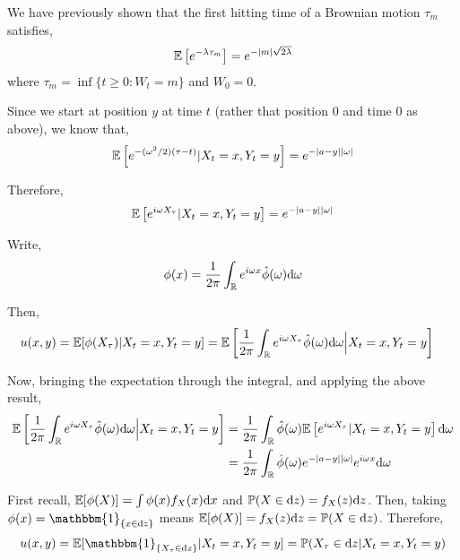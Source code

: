 \documentclass[10pt]{article}
\begin{document}
\begin{solution}[Solution]
\begin{enumerate}
        We have previously shown that the first hitting time of a Brownian motion \( \tau_m \) satisfies,
        \begin{align*}
            \mathbb{E}\left[ e^{-\lambda \tau_m}\right] = e^{-|m|\sqrt{2 \lambda}}
        \end{align*}
        where \( \tau_m = \inf\{t\geq 0 : W_t = m\} \) and \( W_0 = 0 \). 

        Since we start at position \( y \) at time \( t \) (rather that position \( 0 \) and time \( 0 \) as above), we know that,
        \begin{align*}
            \mathbb{E}\left[ e^{-(\omega^2/2)(\tau-t)} | X_t=x, Y_t = y\right] = e^{-|a-y||\omega|} 
        \end{align*}
        
        Therefore,
        \begin{align*}
            \mathbb{E} \left[ e^{i\omega X_\tau} | X_t = x, Y_t = y \right] = e^{-|a-y||\omega|}
        \end{align*}
        
        Write,
        \begin{align*}
            \phi(x) = \dfrac{1}{2\pi} \int_{\mathbb{R}} e^{i\omega x}\hat{\phi}(\omega) \mathrm{d} \omega
        \end{align*}
        
        Then,
        \begin{align*}
            u(x,y) = \mathbb{E}[ \phi(X_\tau) | X_t = x, Y_t = y ] 
            &= \mathbb{E} \left[ \dfrac{1}{2\pi}\int_{\mathbb{R}} e^{i\omega X_\tau} \hat{\phi}(\omega) \mathrm{d} \omega \Big| X_t = x, Y_t = y\right] 
        \end{align*}

        Now, bringing the expectation through the integral, and applying the above result,
        \begin{align*}
            \mathbb{E} \left[ \dfrac{1}{2\pi}\int_{\mathbb{R}} e^{i\omega X_\tau} \hat{\phi}(\omega) \mathrm{d} \omega \Big| X_t = x, Y_t = y\right] 
            &= \dfrac{1}{2\pi} \int_{\mathbb{R}} \hat{\phi}(\omega) \mathbb{E} \left[ e^{i\omega X_\tau} | X_t =x, Y_t =y  \right] \mathrm{d}\omega
            \\&= \dfrac{1}{2\pi} \int_{\mathbb{R}} \hat{\phi}(\omega) e^{-|a-y||\omega|} e^{i\omega x} \mathrm{d}\omega
        \end{align*}
        

        First recall, \( \mathbb{E}[\phi(X)] = \int \phi(x)f_X(x)\mathrm{d} x \) and \( \mathbb{P}(X\in\mathrm{d} z) = f_X(z) \mathrm{d} z \). Then, taking \( \phi(x) =  \mathbbm{1}_{\{ x\in \d z \}} \) means \( \mathbb{E}[\phi(X)] = f_X(z)\mathrm{d} z = \mathbb{P}(X\in\mathrm{d} z) \). Therefore,
        \begin{align*}
            u(x,y) = \EE[\mathbbm{1}_{\{X_\tau\in \d z\}} | X_t = x, Y_t =y] = \PP( X_\tau \in \d z | X_t = x, Y_t = y) 
        \end{align*}
        

\end{enumerate}
\end{solution}
\end{document}
